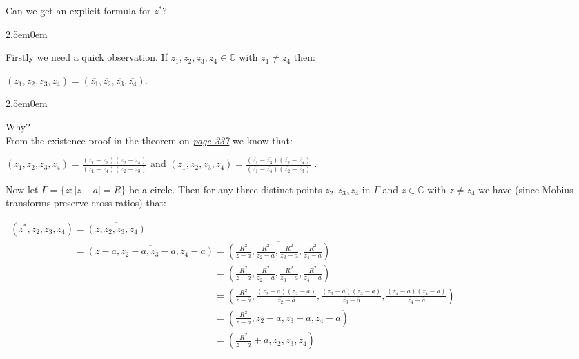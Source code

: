 \documentclass{book}
\newcommand{\inLinkRap}[2]{{\color{blue}\hyperlink{#1}{\textit{#2}}}}
\newcommand{\hThree}{%
   \color{Black}%
   \fontsize{12}{14}\selectfont%
}
\newcommand{\pracTwo}{
   \color{Orange}%
   \fontsize{12}{14}\selectfont%
}
\newenvironment{myIndent}{%
   \begin{adjustwidth}{2.5em}{0em}%
}{%
   \end{adjustwidth}%
}
\newcommand{\retTwo}{\hfill\bigbreak}
\begin{document}
Can we get an explicit formula for $z^*$?
\begin{myIndent}\hThree
	Firstly we need a quick observation. If $z_1, z_2, z_3, z_4 \in \mathbb{C}$ with $z_1 \neq z_4$ then:
	
	{\centering$\overline{(z_1, z_2, z_3, z_4)} = (\overline{z_1}, \overline{z_2}, \overline{z_3}, \overline{z_4})$.\retTwo\par}

	\begin{myIndent}\pracTwo
		Why?\\
		From the existence proof in the theorem on \inLinkRap{page 337 reference}{page 337} we know that:
		
		{\centering$(z_1, z_2, z_3, z_4) = \frac{(z_1 - z_3)(z_2 - z_4)}{(z_1 - z_4)(z_2 - z_3)}$ and $(\overline{z_1}, \overline{z_2}, \overline{z_3}, \overline{z_4}) = \frac{(\overline{z_1} - \overline{z_3})(\overline{z_2} - \overline{z_4})}{(\overline{z_1} - \overline{z_4})(\overline{z_2} - \overline{z_3})}$ .\retTwo\par}
	\end{myIndent}

	Now let $\Gamma = \{z : |z - a| = R\}$ be a circle. Then for any three distinct points $z_2, z_3, z_4$ in $\Gamma$ and $z \in \mathbb{C}$ with $z \neq z_4$ we have (since Mobius transforms preserve cross ratios) that:

	{\centering\begin{tabular}{l}
		$(z^*, z_2, z_3, z_4) = \overline{(z, z_2, z_3, z_4)}$\\ [6pt]
		$\phantom{(z^*, z_2, z_3, z_4)} = \overline{(z - a, z_2 - a, z_3 - a, z_4 - a)} = \overline{(\frac{R^2}{z - a}, \frac{R^2}{z_2 - a}, \frac{R^2}{z_3 - a}, \frac{R^2}{z_4 - a})}$\\ [6pt]
		$\phantom{(z^*, z_2, z_3, z_4) = \overline{(z - a, z_2 - a, z_3 - a, z_4 - a)}} =(\frac{R^2}{\overline{z} - \overline{a}}, \frac{R^2}{\overline{z_2} - \overline{a}}, \frac{R^2}{\overline{z_3} - \overline{a}}, \frac{R^2}{\overline{z_4} - \overline{a}})$\\ [6pt]
		$\phantom{(z^*, z_2, z_3, z_4) = \overline{(z - a, z_2 - a, z_3 - a, z_4 - a)}} =(\frac{R^2}{\overline{z} - \overline{a}}, \frac{(z_2 - a)(\overline{z_2} - \overline{a})}{\overline{z_2} - \overline{a}}, \frac{(z_3 - a)(\overline{z_3} - \overline{a})}{\overline{z_3} - \overline{a}}, \frac{(z_4 - a)(\overline{z_4} - \overline{a})}{\overline{z_4} - \overline{a}})$\\ [6pt]
		$\phantom{(z^*, z_2, z_3, z_4) = \overline{(z - a, z_2 - a, z_3 - a, z_4 - a)}} = (\frac{R^2}{\overline{z} - \overline{a}}, z_2 - a, z_3 - a, z_4 - a)$\\ [6pt]
		$\phantom{(z^*, z_2, z_3, z_4) = \overline{(z - a, z_2 - a, z_3 - a, z_4 - a)}} = (\frac{R^2}{\overline{z} - \overline{a}} + a, z_2, z_3, z_4)$
	\end{tabular}\newpage\par}


\end{myIndent}
\end{document}
